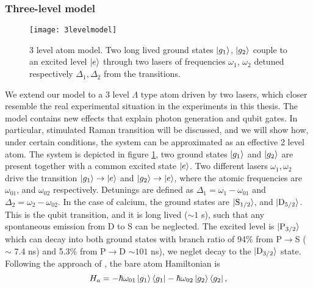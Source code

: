 \subsubsection{Three-level model}
\label{sec:threelevel}
\begin{figure}
\centering
\texttt{[image: 3levelmodel]}
\caption{3 level atom model. Two long lived ground states $\ket{g_1}$, $\ket{g_2}$ couple to an excited level $\ket{e}$ through two lasers of frequencies $\omega_1$, $\omega_2$ detuned respectively $\Delta_1,\Delta_2$ from the transitions.}
\label{3levelmodel}
\end{figure}
We extend our model to a 3 level $\Lambda$ type atom driven by two lasers, which closer resemble the real experimental situation in the experiments in this thesis. The model contains new effects that explain photon generation and qubit gates. In particular, stimulated Raman transition will be discussed, and we will show how, under certain conditions, the system can be approximated as an effective 2 level atom. The system is depicted in figure \ref{3levelmodel}, two ground states $\ket{g_1}$ and $\ket{g_2}$ are present together with a common excited state $\ket{e}$. Two different lasers $\omega_1,\omega_2$ drive the transition $\ket{g_1} \to \ket{e}$ and $\ket{g_2} \to \ket{e}$, where the atomic frequencies are $\omega_{01}$, and $\omega_{02}$ respectively. Detunings are defined as $\Delta_1 = \omega_1 - \omega_{01}$ and $\Delta_2 = \omega_2 - \omega_{02}$. In the case of calcium, the ground states are $\ket{\text{S}_{1/2}}$, and $\ket{\text{D}_{5/2}}$. This is the qubit transition, and it is long lived ($\sim 1$ s), such that any spontaneous emission from D to S can be neglected. The excited level is $\ket{\text{P}_{3/2}}$ which can decay into both ground states with branch ratio of 94\% from P$\to$S ($\sim$ 7.4 ns) and 5.3\% from P$\to$D $\sim 101$ ns), we neglet decay to the $\ket{\text{D}_{3/2}}$ state.\\
Following the approach of \cite{steck}, the bare atom Hamiltonian is
\begin{equation}
H_a = -\hbar \omega_{01}\ket{g_1}\bra{g_1} - \hbar \omega_{02}\ket{g_2}\bra{g_2},
\end{equation}
